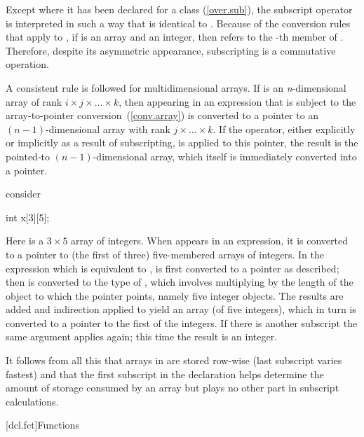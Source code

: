 \pnum
\enternote
Except where it has been declared for a class (\ref{over.sub}),
the subscript operator
\tcode{[]}
is interpreted
in such a way that
is identical to
.
Because of the conversion rules
that apply to
\tcode{+},
if
is an array and
an integer,
then
refers to the
-th
member of
.
Therefore,
despite its asymmetric
appearance, subscripting is a commutative operation.

\pnum
A consistent rule is followed for
%
multidimensional arrays.
If
is an
\textit{n}-dimensional
array
of rank
$i \times j \times \ldots \times k$,
then
appearing in an expression
that is subject to the array-to-pointer conversion~(\ref{conv.array})
is converted to
a pointer to an $(n-1)$-dimensional
array with rank
$j \times \ldots \times k$.
If the
\tcode{*}
operator, either explicitly
or implicitly as a result of subscripting,
is applied to this pointer,
the result is the pointed-to $(n-1)$-dimensional array,
which itself is immediately converted into a pointer.

\pnum
\enterexample
consider

\begin{codeblock}
int x[3][5];
\end{codeblock}

Here
is a $3 \times 5$ array of integers.
When
appears in an expression, it is converted
to a pointer to (the first of three) five-membered arrays of integers.
In the expression
which is equivalent to
,
is first converted to a pointer as described;
then
is converted to the type of
,
which involves multiplying
by the
length of the object to which the pointer points,
namely five integer objects.
The results are added and indirection applied to
yield an array (of five integers), which in turn is converted to
a pointer to the first of the integers.
If there is another subscript the same argument applies
again; this time the result is an integer.
\exitexample
\exitnote

\pnum
\enternote
It follows from all this that arrays in \Cpp are stored
row-wise (last subscript varies fastest)
%
and that the first subscript in the declaration helps determine
the amount of storage consumed by an array
but plays no other part in subscript calculations.
\exitnote

[dcl.fct]{Functions}%

